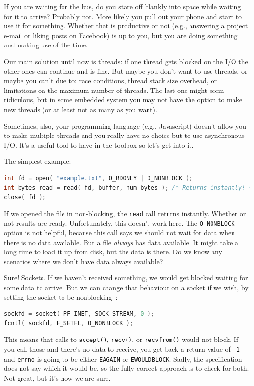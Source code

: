 \documentclass[a4paper]{report}
\begin{document}
If you are waiting for the bus, do you stare off blankly into space while waiting for it to arrive? Probably not. More likely you pull out your phone and start to use it for something. Whether that is productive or not (e.g., answering a project e-mail or liking posts on Facebook) is up to you, but you are doing something and making use of the time.

Our main solution until now is threads: if one thread gets blocked on the I/O the other ones can continue and is fine. But maybe you don't want to use threads, or maybe you can't due to: race conditions, thread stack size overhead, or limitations on the maximum number of threads. The last one might seem ridiculous, but in some embedded system you may not have the option to make new threads (or at least not as many as you want).

Sometimes, also, your programming language (e.g., Javascript) doesn't allow you to make multiple threads and you really have no choice but to use asynchronous I/O. It's a useful tool to have in the toolbox so let's get into it.

The simplest example:

\begin{lstlisting}[language=C]
int fd = open( "example.txt", O_RDONLY | O_NONBLOCK );
int bytes_read = read( fd, buffer, num_bytes ); /* Returns instantly! */
close( fd );
\end{lstlisting}

If we opened the file in non-blocking, the \texttt{read} call returns instantly. Whether or not results are ready. Unfortunately, this doesn't work here. The \texttt{O\_NONBLOCK} option is not helpful, because this call says we should not wait for data when there is no data available. But a file \textit{always} has data available. It might take a long time to load it up from disk, but the data is there. Do we know any scenarios where we don't have data always available?

Sure! Sockets. If we haven't received something, we would get blocked waiting for some data to arrive. But we can change that behaviour on a socket if we wish, by setting the socket to be nonblocking~\cite{getaddrinfo}:

\begin{lstlisting}[language=C]
sockfd = socket( PF_INET, SOCK_STREAM, 0 );
fcntl( sockfd, F_SETFL, O_NONBLOCK );
\end{lstlisting}

This means that calls to \texttt{accept()}, \texttt{recv()}, or \texttt{recvfrom()} would not block. If you call those and there's no data to receive, you get back a return value of \texttt{-1} and \texttt{errno} is going to be either \texttt{EAGAIN} or \texttt{EWOULDBLOCK}. Sadly, the specification does not say which it would be, so the fully correct approach is to check for both. Not great, but it's how we are sure.
\end{document}
